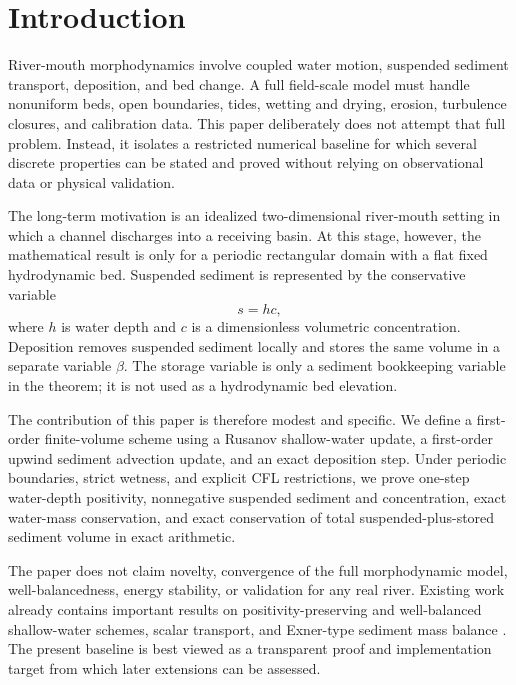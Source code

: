 \section{Introduction}

River-mouth morphodynamics involve coupled water motion, suspended sediment transport, deposition, and bed change. A full field-scale model must handle nonuniform beds, open boundaries, tides, wetting and drying, erosion, turbulence closures, and calibration data. This paper deliberately does not attempt that full problem. Instead, it isolates a restricted numerical baseline for which several discrete properties can be stated and proved without relying on observational data or physical validation.

The long-term motivation is an idealized two-dimensional river-mouth setting in which a channel discharges into a receiving basin. At this stage, however, the mathematical result is only for a periodic rectangular domain with a flat fixed hydrodynamic bed. Suspended sediment is represented by the conservative variable
\[
  s = h c,
\]
where \(h\) is water depth and \(c\) is a dimensionless volumetric concentration. Deposition removes suspended sediment locally and stores the same volume in a separate variable \(\beta\). The storage variable is only a sediment bookkeeping variable in the theorem; it is not used as a hydrodynamic bed elevation.

The contribution of this paper is therefore modest and specific. We define a first-order finite-volume scheme using a Rusanov shallow-water update, a first-order upwind sediment advection update, and an exact deposition step. Under periodic boundaries, strict wetness, and explicit CFL restrictions, we prove one-step water-depth positivity, nonnegative suspended sediment and concentration, exact water-mass conservation, and exact conservation of total suspended-plus-stored sediment volume in exact arithmetic.

The paper does not claim novelty, convergence of the full morphodynamic model, well-balancedness, energy stability, or validation for any real river. Existing work already contains important results on positivity-preserving and well-balanced shallow-water schemes, scalar transport, and Exner-type sediment mass balance \cite{audusse2004,kurganov2007,paola2005,karjoun2020}. The present baseline is best viewed as a transparent proof and implementation target from which later extensions can be assessed.
